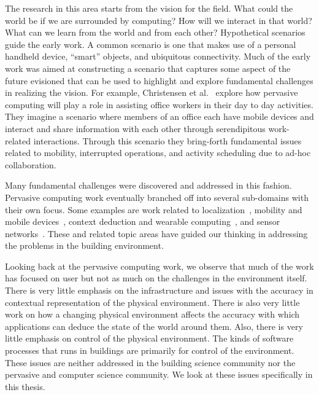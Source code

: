The research in this area starts from the vision for the field.  What could the world be if we are surrounded by computing?
How will we interact in that world?  What can we learn from the world and from each other?  Hypothetical scenarios
guide the early work.  A common scenario is one that makes use of a personal handheld device, ``smart'' objects, and 
ubiquitous connectivity.  Much of the early work was aimed at constructing a scenario that captures some aspect of
the future evisioned that can be used to highlight and explore fundamental challenges in realizing the vision.
For example, Christensen et al.~\cite{Christensen_2002} explore how pervasive computing will play a role in assisting
office workers in their day to day activities.  They imagine a scenario where members of an office each have mobile devices
and interact and share information with each other through serendipitous work-related interactions.  Through this scenario
they bring-forth fundamental issues related to mobility, interrupted operations, and activity scheduling due to ad-hoc 
collaboration.

Many fundamental challenges were discovered and addressed in this fashion.  Pervasive computing work eventually branched
off into several sub-domains with their own focus.  Some examples are work related to 
localization~\cite{Castro01aprobabilistic,Koo,Romer03thelighthouse,Yoon2013}, 
mobility and mobile devices~\cite{Haritaoglu:2001:ILR:647987.741331,Want02thepersonal,Jiang:2011:MPM:2030112.2030150},
context deduction and wearable computing~\cite{Holmquist01smart,Lukowicz2002,Christensen_2002,Rossi:2011:RWC:2030112.2030238},
and sensor networks~\cite{Conner:2001:MEL:647987.741329,Lymberopoulos09amethodology}.  These and related
topic areas have guided our thinking in addressing the problems in the building environment.

Looking back at the pervasive computing work, we observe that much of the work has focused on user but not as much on 
the challenges in the environment itself.  There is very little
emphasis on the infrastructure and issues with the accuracy in contextual representation of the physical environment.
There is also very little work on how a changing physical environment affects the accuracy with which applications can 
deduce the state of the world around them.  Also, there is very little emphasis on control of the physical environment.
The kinds of software processes that runs in buildings are primarily for control of the environment.  These issues
are neither addressed in the building science community nor the pervasive and computer science community.  We look at these
issues specifically in this thesis.



